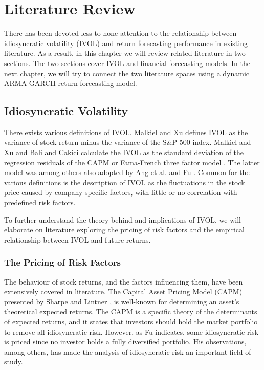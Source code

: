 \chapter{Literature Review}
\label{LR}
There has been devoted less to none attention to the relationship between idiosyncratic volatility (IVOL) and return forecasting performance in existing literature. As a result, in this chapter we will review related literature in two sections. The two sections cover IVOL and financial forecasting models. In the next chapter, we will try to connect the two literature spaces using a dynamic ARMA-GARCH return forecasting model.  

\section{Idiosyncratic Volatility}  
There exists various definitions of IVOL. Malkiel and Xu \cite{malkielxu97} defines IVOL as the variance of stock return minus the variance of the S\&P 500 index. Malkiel and Xu \cite{malkielxu04} and Bali and Cakici \cite{balicakici08} calculate the IVOL as the standard deviation of the regression residuals of the CAPM or Fama-French three factor model \cite{famafrench}. The latter model was among others also adopted by Ang et al. \cite{angetal06} \cite{angetal09} and Fu \cite{Fu}. Common for the various definitions is the description of IVOL as the fluctuations in the stock price caused by company-specific factors, with little or no correlation with predefined risk factors.

To further understand the theory behind and implications of IVOL, we will elaborate on literature exploring the pricing of risk factors and the empirical relationship between IVOL and future returns.

\subsection{The Pricing of Risk Factors}
The behaviour of stock returns, and the factors influencing them, have been extensively covered in literature. The Capital Asset Pricing Model (CAPM) presented by Sharpe \cite{sharpe} and Lintner \cite{litner}, is well-known for determining an asset's theoretical expected returns. The CAPM is a specific theory of the determinants of expected returns, and it states that investors should hold the market portfolio to remove all idiosyncratic risk. However, as Fu \cite{Fu} indicates, some idiosyncratic risk is priced since no investor holds a fully diversified portfolio. His observations, among others, has made the analysis of idiosyncratic risk an important field of study.

